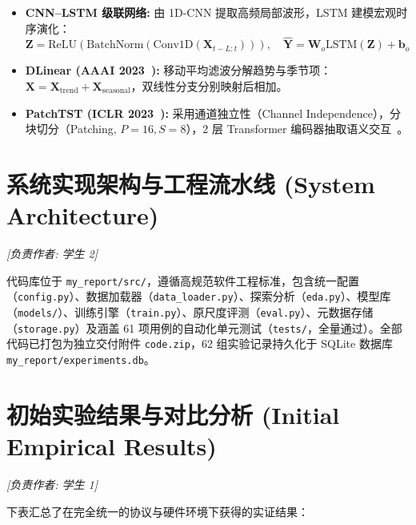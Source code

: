 \documentclass[11pt,a4paper,UTF8]{ctexart}
\begin{document}
\begin{itemize}
    \item \textbf{CNN--LSTM 级联网络:} 由 1D-CNN 提取高频局部波形，LSTM 建模宏观时序演化：
    \begin{equation}
        \mathbf{Z} = \text{ReLU}\left(\text{BatchNorm}\left(\text{Conv1D}\left(\mathbf{X}_{t-L:t}\right)\right)\right), \quad \hat{\mathbf{Y}} = \mathbf{W}_o \text{LSTM}(\mathbf{Z}) + \mathbf{b}_o
    \end{equation}
    \item \textbf{DLinear (AAAI 2023~\cite{zeng2023transformers}):} 移动平均滤波分解趋势与季节项：$\mathbf{X} = \mathbf{X}_{\text{trend}} + \mathbf{X}_{\text{seasonal}}$，双线性分支分别映射后相加。
    \item \textbf{PatchTST (ICLR 2023~\cite{nie2023time}):} 采用通道独立性（Channel Independence），分块切分（Patching, $P=16, S=8$），2 层 Transformer 编码器抽取语义交互~\cite{wu2021autoformer}。
\end{itemize}

\section{系统实现架构与工程流水线 (System Architecture)}
\label{sec:system}
\noindent\textit{[负责作者: 学生 2]}

代码库位于 \texttt{my\_report/src/}，遵循高规范软件工程标准，包含统一配置（\texttt{config.py}）、数据加载器（\texttt{data\_loader.py}）、探索分析（\texttt{eda.py}）、模型库（\texttt{models/}）、训练引擎（\texttt{train.py}）、原尺度评测（\texttt{eval.py}）、元数据存储（\texttt{storage.py}）及涵盖 61 项用例的自动化单元测试（\texttt{tests/}，全量通过）。全部代码已打包为独立交付附件 \texttt{code.zip}，62 组实验记录持久化于 SQLite 数据库 \texttt{my\_report/experiments.db}。

\section{初始实验结果与对比分析 (Initial Empirical Results)}
\label{sec:results}
\noindent\textit{[负责作者: 学生 1]}

下表汇总了在完全统一的协议与硬件环境下获得的实证结果：
\end{document}
